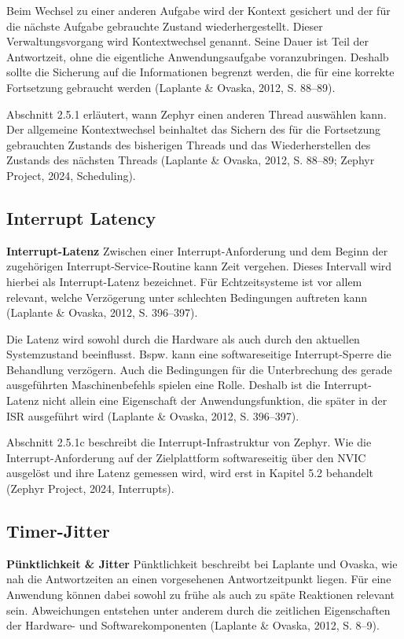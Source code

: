 Beim Wechsel zu einer anderen Aufgabe wird der Kontext gesichert und der f{\"u}r die n{\"a}chste Aufgabe gebrauchte Zustand wiederhergestellt. Dieser Verwaltungsvorgang wird Kontextwechsel genannt. Seine Dauer ist Teil der Antwortzeit, ohne die eigentliche Anwendungsaufgabe voranzubringen. Deshalb sollte die Sicherung auf die Informationen begrenzt werden, die f{\"u}r eine korrekte Fortsetzung gebraucht werden (Laplante \& Ovaska, 2012, S. 88--89).

Abschnitt 2.5.1 erl{\"a}utert, wann Zephyr einen anderen Thread ausw{\"a}hlen kann. Der allgemeine Kontextwechsel beinhaltet das Sichern des f{\"u}r die Fortsetzung gebrauchten Zustands des bisherigen Threads und das Wiederherstellen des Zustands des n{\"a}chsten Threads (Laplante \& Ovaska, 2012, S. 88--89; Zephyr Project, 2024, \glqq{}Scheduling\grqq{}).

\subsection{Interrupt Latency}
\textbf{Interrupt-Latenz }Zwischen einer Interrupt-Anforderung und dem Beginn der zugeh{\"o}rigen Interrupt-Service-Routine kann Zeit vergehen. Dieses Intervall wird hierbei als Interrupt-Latenz bezeichnet. F{\"u}r Echtzeitsysteme ist vor allem relevant, welche Verz{\"o}gerung unter schlechten Bedingungen auftreten kann (Laplante \& Ovaska, 2012, S. 396--397).

Die Latenz wird sowohl durch die Hardware als auch durch den aktuellen Systemzustand beeinflusst. Bspw. kann eine softwareseitige Interrupt-Sperre die Behandlung verz{\"o}gern. Auch die Bedingungen f{\"u}r die Unterbrechung des gerade ausgef{\"u}hrten Maschinenbefehls spielen eine Rolle. Deshalb ist die Interrupt-Latenz nicht allein eine Eigenschaft der Anwendungsfunktion, die sp{\"a}ter in der ISR ausgef{\"u}hrt wird (Laplante \& Ovaska, 2012, S. 396--397).

Abschnitt 2.5.1c beschreibt die Interrupt-Infrastruktur von Zephyr. Wie die Interrupt-Anforderung auf der Zielplattform softwareseitig {\"u}ber den NVIC ausgel{\"o}st und ihre Latenz gemessen wird, wird erst in Kapitel 5.2 behandelt (Zephyr Project, 2024, \glqq{}Interrupts\grqq{}).

\subsection{Timer-Jitter}
\textbf{P{\"u}nktlichkeit \& Jitter }P{\"u}nktlichkeit beschreibt bei Laplante und Ovaska, wie nah die Antwortzeiten an einen vorgesehenen Antwortzeitpunkt liegen. F{\"u}r eine Anwendung k{\"o}nnen dabei sowohl zu fr{\"u}he als auch zu sp{\"a}te Reaktionen relevant sein. Abweichungen entstehen unter anderem durch die zeitlichen Eigenschaften der Hardware- und Softwarekomponenten (Laplante \& Ovaska, 2012, S. 8--9).

